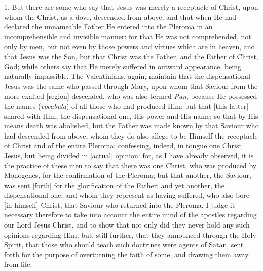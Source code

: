 \documentclass[9pt, twocolumn, oneside, a4paper]{memoir}
\begin{document}
1. But  there are some who say that Jesus was merely a receptacle of Christ, upon whom the Christ, as a dove, descended from above, and that when He had declared the unnameable Father He entered into the Pleroma in an incomprehensible and invisible manner: for that He was not comprehended, not only by men, but not even by those powers and virtues which are in heaven, and that Jesus was the Son, but that  Christ was the Father, and the Father of Christ, God; while others say that He merely suffered in outward appearance, being naturally impassible. The Valentinians, again, maintain that the dispensational Jesus was the same who passed through Mary, upon whom that Saviour from the more exalted [region] descended, who was also termed \textit{Pan},  because He possessed the names (\textit{vocabula}) of all those who had produced Him; but that [this latter] shared with Him, the dispensational one, His power and His name; so that by His means death was abolished, but the Father was made known by that Saviour who had descended from above, whom they do also allege to be Himself the receptacle of Christ and of the entire Pleroma; confessing, indeed, in tongue one Christ Jesus, but being divided in [actual] opinion: for, as I have already observed, it is the practice of these men to say that there was one Christ, who was produced by Monogenes, for the confirmation of the Pleroma; but that another, the Saviour, was sent [forth] for the glorification of the Father; and yet another, the dispensational one, and whom they represent as having suffered, who also bore [in himself] Christ, that Saviour who returned into the Pleroma. I judge it necessary therefore to take into account the entire mind of the apostles regarding our Lord Jesus Christ, and to show that not only did they never hold any such opinions regarding Him; but, still further, that they announced through the Holy Spirit, that those who should teach such doctrines were agents of Satan, sent forth for the purpose of overturning the faith of some, and drawing them away from life.
\end{document}
